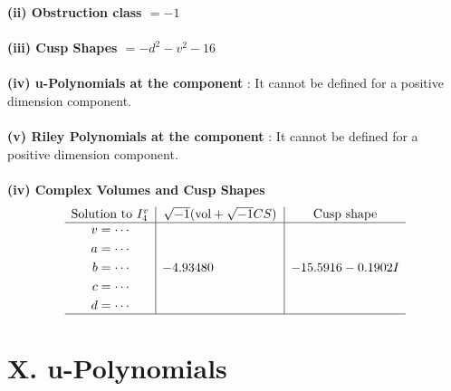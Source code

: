 \documentclass[1p]{elsarticle_modified}
\theoremstyle{definition}
\newcommand{\I}{\sqrt{-1}}
\begin{document}
\flushleft \textbf{(ii) Obstruction class $= -1$}\\~\\
\flushleft \textbf{(iii) Cusp Shapes $= - d^2- v^2-16$}\\~\\
\flushleft \textbf{(iv) u-Polynomials at the component} : It cannot be defined for a positive dimension component.\\~\\
\flushleft \textbf{(v) Riley Polynomials at the component} : It cannot be defined for a positive dimension component.\\~\\
\newpage\flushleft \textbf{(iv) Complex Volumes and Cusp Shapes}
$$\begin{array}{c|c|c} 
\text{Solution to }I^v_{4}& \I (\text{vol} + \sqrt{-1}CS) & \text{Cusp shape}\\
 \hline 
\begin{aligned}
v &= \cdots \\
a &= \cdots \\
b &= \cdots \\
c &= \cdots \\
d &= \cdots\end{aligned}
 & -4.93480\phantom{ +0.000000I} & -15.5916 - 0.1902 I\\
 \hline 
 \end{array}
$$
\newpage\renewcommand{\arraystretch}{1}
\centering \section*{ X. u-Polynomials}
\end{document}
